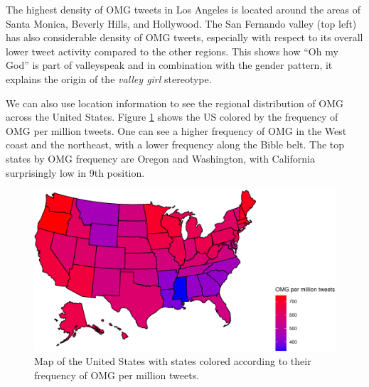 \documentclass[]{article}
\begin{document}
The highest density of OMG tweets in Los Angeles is located around the areas of Santa Monica, Beverly Hills, and Hollywood. The San Fernando valley (top left) has also considerable density of OMG tweets, especially with respect to its overall lower tweet activity compared to the other regions. This shows how ``Oh my God'' is part of valleyspeak and in combination with the gender pattern, it explains the origin of the \emph{valley girl} stereotype.


We can also use location information to see the regional distribution of OMG across the United States. Figure \ref{fig:twitterstates} shows the US colored by the frequency of OMG per million tweets. One can see a higher frequency of OMG in the West coast and the northeast, with a lower frequency along the Bible belt. The top states by OMG frequency are Oregon and Washington, with California surprisingly low in 9th position.


\begin{figure}

{\centering \includegraphics[width=\linewidth]{Friends_HPS_pdf_files/figure-latex/twitterstates-1} 

}

\caption{Map of the United States with states colored according to their frequency of OMG per million tweets.}\label{fig:twitterstates}
\end{figure}
\end{document}
